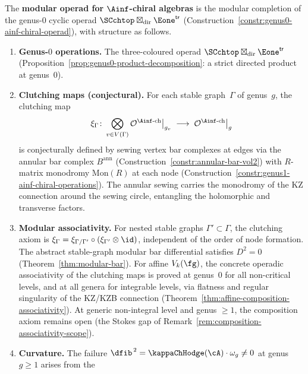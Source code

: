 \begin{definition}
\label{def:modular-operad-ainf-chiral}
The \textbf{modular operad for $\Ainf$-chiral algebras} is the
modular completion of the genus-$0$ cyclic operad
$\SCchtop\boxtimes_{\mathrm{dir}}\Eone^{\mathsf{tr}}$
(Construction~\textup{\ref{constr:genus0-ainf-chiral-operad}}),
with structure as follows.
\begin{enumerate}[label=\textup{(\roman*)}]
\item \textbf{Genus-$0$ operations.}
 The three-coloured operad
 $\SCchtop\boxtimes_{\mathrm{dir}}\Eone^{\mathsf{tr}}$
 (Proposition~\textup{\ref{prop:genus0-product-decomposition}}:
 a strict directed product at genus~$0$).
\item \textbf{Clutching maps (conjectural).}
 For each stable graph~$\Gamma$ of genus~$g$, the clutching map
 \[
 \xi_\Gamma \colon
 \bigotimes_{v \in V(\Gamma)}
 \mathcal{O}^{\Ainf\text{-ch}}\big|_{g_v}
 \;\longrightarrow\;
 \mathcal{O}^{\Ainf\text{-ch}}\big|_{g}
 \]
 is conjecturally defined by sewing vertex bar complexes at edges via the
 annular bar complex $B^{\mathrm{ann}}$
 (Construction~\textup{\ref{constr:annular-bar-vol2}})
 with $R$-matrix monodromy $\mathrm{Mon}(R)$ at each node
 (Construction~\textup{\ref{constr:genus1-ainf-chiral-operations}}).
 The annular sewing carries the monodromy of the KZ connection
 around the sewing circle, entangling the holomorphic
 and transverse factors.
\item \textbf{Modular associativity.}
 For nested stable graphs $\Gamma' \subset \Gamma$, the
 clutching axiom is
 $\xi_\Gamma = \xi_{\Gamma/\Gamma'} \circ
 (\xi_{\Gamma'} \otimes \id)$,
 independent of the order of node formation.
 The abstract stable-graph modular bar differential
 satisfies $D^2=0$
 (Theorem~\textup{\ref{thm:modular-bar}}).
 For affine $V_k(\fg)$, the concrete operadic
 associativity of the clutching maps is proved at
 genus~$0$ for all non-critical levels, and at all
 genera for integrable levels, via flatness and
 regular singularity of the KZ\slash KZB connection
 (Theorem~\textup{\ref{thm:affine-composition-associativity}}).
 At generic non-integral level and genus $\ge 1$,
 the composition axiom remains open
 (the Stokes gap of
 Remark~\textup{\ref{rem:composition-associativity-scope}}).
\item \textbf{Curvature.}
 The failure $\dfib^{\,2} = \kappaChHodge(\cA) \cdot
 \omega_g \neq 0$ at genus $g \ge 1$ arises from the

\end{enumerate}
\end{definition}

